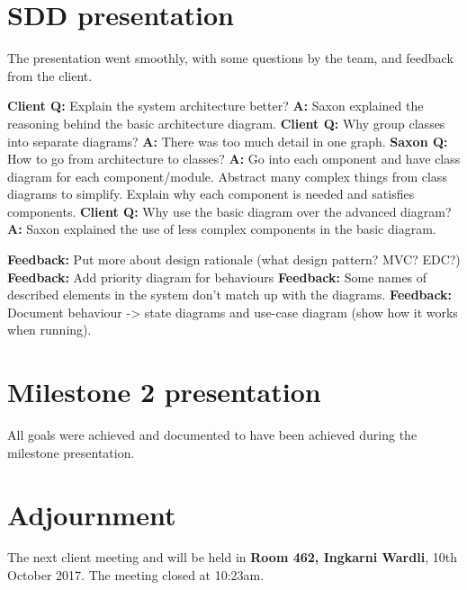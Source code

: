 \documentclass{article}
\begin{document}
\section{SDD presentation}
The presentation went smoothly, with some questions by the team, and feedback from the client.
\begin{flushleft}
{\bfseries Client Q:} Explain the system architecture better?\linebreak
{\bfseries A:} Saxon explained the reasoning behind the basic architecture diagram.\linebreak
{\bfseries Client Q:} Why group classes into separate diagrams?\linebreak
{\bfseries A:} There was too much detail in one graph.\linebreak
{\bfseries Saxon Q:} How to go from architecture to classes?\linebreak
{\bfseries A:} Go into each omponent and have class diagram for each component/module. Abstract many complex things from class diagrams to simplify. Explain why each component is needed and satisfies components.\linebreak
{\bfseries Client Q:} Why use the basic diagram over the advanced diagram?\linebreak
{\bfseries A:} Saxon explained the use of less complex components in the basic diagram. \linebreak \linebreak

{\bfseries Feedback:} Put more about design rationale (what design pattern? MVC? EDC?)\linebreak
{\bfseries Feedback:} Add priority diagram for behaviours\linebreak
{\bfseries Feedback:} Some names of described elements in the system don't match up with the diagrams.\linebreak
{\bfseries Feedback:} Document behaviour -> state diagrams and use-case diagram (show how it works when running).\linebreak

\end{flushleft}
	
\section{Milestone 2 presentation}
\begin{flushleft}
All goals were achieved and documented to have been achieved during the milestone presentation.
\end{flushleft}

\section{Adjournment}	
    The next client meeting and will be held in {\bf Room 462, Ingkarni Wardli}, 10th October 2017.
The meeting closed at 10:23am.
\end{document}
